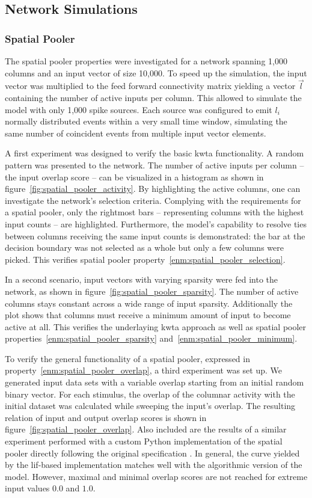 \subsection{Network Simulations}

\subsubsection{Spatial Pooler}

The spatial pooler properties were investigated for a network spanning 1,000 columns and an input vector of size 10,000. To speed up the simulation, the input vector was multiplied to the feed forward connectivity matrix yielding a vector $\vec{l}$ containing the number of active inputs per column. This allowed to simulate the model with only 1,000 spike sources. Each source was configured to emit $l_i$ normally distributed events within a very small time window, simulating the same number of coincident events from multiple input vector elements.

A first experiment was designed to verify the basic \gls{kwta} functionality. A random pattern was presented to the network. The number of active inputs per column -- the input overlap score -- can be visualized in a histogram as shown in figure~\ref{fig:spatial_pooler_activity}. By highlighting the active columns, one can investigate the network's selection criteria. Complying with the requirements for a spatial pooler, only the rightmost bars -- representing columns with the highest input counts -- are highlighted. Furthermore, the model's capability to resolve ties between columns receiving the same input counts is demonstrated: the bar at the decision boundary was not selected as a whole but only a few columns were picked. This verifies spatial pooler property~\ref{enm:spatial_pooler_selection}.

In a second scenario, input vectors with varying sparsity were fed into the network, as shown in figure~\ref{fig:spatial_pooler_sparsity}. The number of active columns stays constant across a wide range of input sparsity. Additionally the plot shows that columns must receive a minimum amount of input to become active at all. This verifies the underlaying \gls{kwta} approach as well as spatial pooler properties~\ref{enm:spatial_pooler_sparsity} and~\ref{enm:spatial_pooler_minimum}.

To verify the general functionality of a spatial pooler, expressed in property~\ref{enm:spatial_pooler_overlap}, a third experiment was set up. We generated input data sets with a variable overlap starting from an initial random binary vector. For each stimulus, the overlap of the columnar activity with the initial dataset was calculated while sweeping the input's overlap. The resulting relation of input and output overlap scores is shown in figure~\ref{fig:spatial_pooler_overlap}. Also included are the results of a similar experiment performed with a custom Python implementation of the spatial pooler directly following the original specification \citep{numenta2011htm}. In general, the curve yielded by the \gls{lif}-based implementation matches well with the algorithmic version of the model. However, maximal and minimal overlap scores are not reached for extreme input values $0.0$ and $1.0$.

